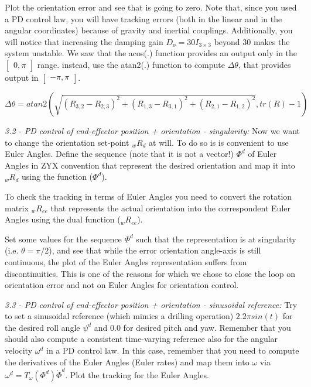 \documentclass[11pt]{article}
\newcommand{\mat}[1]{\ensuremath{\begin{bmatrix}#1\end{bmatrix}}}	%
\begin{document}
Plot   the  orientation error and see that is going to zero.
 Note that, since you used a PD control law,  you will have tracking errors (both in the linear and in the angular  coordinates) because of gravity and inertial couplings. Additionally, you will notice that increasing the damping gain  $D_o = 30I_{3\times3}$ beyond 30 makes the system unstable.
We saw that the acos(.) function provides an output only in the $\mat{ 0 , \pi}$ range. 
instead, use the atan2(.) function to compute  $\Delta \theta$, that provides output in $\mat{ -\pi   , \pi }$.

\begin{equation}
\Delta \theta = atan2\left(\sqrt{(R_{3,2} - R_{2,3})^2 + (R_{1,3} - R_{3,1})^2 + (R_{2,1} - R_{1,2})^2}, tr(R) -1\right)
\end{equation}

\quad

\noindent
\textit{3.2 - PD control of end-effector position + orientation - singularity:}
Now we want to change the orientation set-point  ${}_wR_{d}$ at will. To do so 
is is convenient to use Euler Angles. Define the sequence (note that it is not a vector!)  
$\Phi^d$ of Euler Angles in ZYX convention that represent the desired orientation 
and map it into ${}_wR_{d}$ using the function  ($\Phi^d$). 

To check the tracking in terms of Euler Angles you need to convert the rotation matrix ${}_wR_{ee}$ 
that represents the actual orientation  into the correspondent Euler Angles using the dual function (${}_wR_{ee}$).

Set some values for the sequence $\Phi^d$ such that the representation is at singularity (i.e. $\theta = \pi/2$), 
and see that while the error orientation angle-axis is still continuous, the 
plot of the Euler Angles representation suffers from discontinuities. 
This is one of the reasons for which we chose to close the loop on orientation error and not on Euler Angles for orientation control. 

\textit{3.3 - PD control of end-effector position + orientation - sinusoidal reference:}
Try to set a sinusoidal reference (which mimics a drilling operation)  $ 2.2 \pi sin(t)$ for the desired roll angle $\psi^d$ and 0.0 for desired pitch and yaw. Remember that you should also compute a consistent time-varying reference also for the angular velocity $\omega^{d}$ in a PD control law. In this case, remember that you need to compute the derivatives of the Euler Angles (Euler rates) and map  them into $\omega$ via  $\omega^d = T_{\omega}(\Phi^d)\dot{\Phi}^d$. 
Plot the tracking for the Euler Angles.
\end{document}
